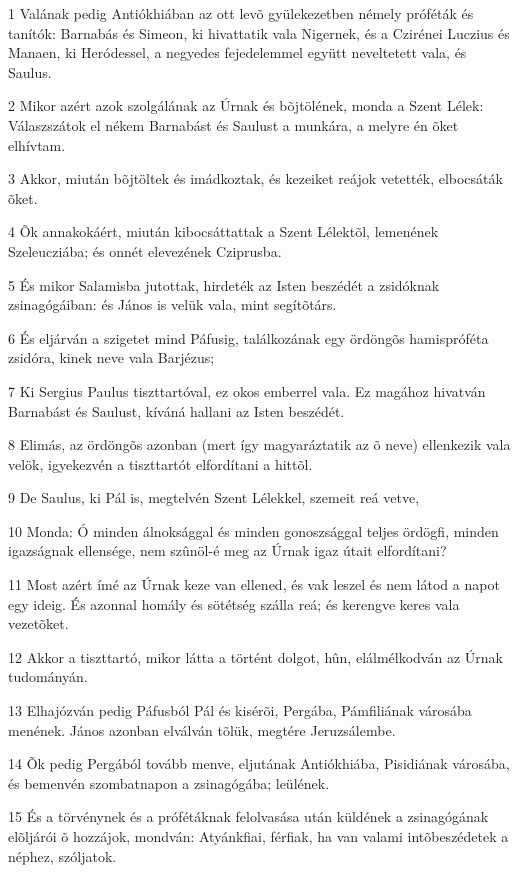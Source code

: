 \par 1 Valának pedig Antiókhiában az ott levõ gyülekezetben némely próféták és tanítók: Barnabás és Simeon, ki hivattatik vala Nigernek, és a Czirénei Luczius és Manaen, ki Heródessel, a negyedes fejedelemmel együtt neveltetett vala, és Saulus.
\par 2 Mikor azért azok szolgálának az Úrnak és bõjtölének, monda a Szent Lélek: Válaszszátok el nékem Barnabást és Saulust a munkára, a melyre én õket elhívtam.
\par 3 Akkor, miután bõjtöltek és imádkoztak, és kezeiket reájok vetették, elbocsáták õket.
\par 4 Õk annakokáért, miután kibocsáttattak a Szent Lélektõl, lemenének Szeleucziába; és onnét elevezének Cziprusba.
\par 5 És mikor Salamisba jutottak, hirdeték az Isten beszédét a zsidóknak zsinagógáiban: és János is velük vala, mint segítõtárs.
\par 6 És eljárván a szigetet mind Páfusig, találkozának egy ördöngõs hamispróféta zsidóra, kinek neve vala Barjézus;
\par 7 Ki Sergius Paulus tiszttartóval, ez okos emberrel vala. Ez magához hivatván Barnabást és Saulust, kíváná hallani az Isten beszédét.
\par 8 Elimás, az ördöngõs azonban (mert így magyaráztatik az õ neve) ellenkezik vala velök, igyekezvén a tiszttartót elfordítani a hittõl.
\par 9 De Saulus, ki Pál is, megtelvén Szent Lélekkel, szemeit reá vetve,
\par 10 Monda: Ó minden álnoksággal és minden gonoszsággal teljes ördögfi, minden igazságnak ellensége, nem szûnöl-é meg az Úrnak igaz útait elfordítani?
\par 11 Most azért ímé az Úrnak keze van ellened, és vak leszel és nem látod a napot egy ideig. És azonnal homály és sötétség szálla reá; és kerengve keres vala vezetõket.
\par 12 Akkor a tiszttartó, mikor látta a történt dolgot, hûn, elálmélkodván az Úrnak tudományán.
\par 13 Elhajózván pedig Páfusból Pál és kisérõi, Pergába, Pámfiliának városába menének. János azonban elválván tõlük, megtére Jeruzsálembe.
\par 14 Õk pedig Pergából tovább menve, eljutának Antiókhiába, Pisidiának városába, és bemenvén szombatnapon a zsinagógába; leülének.
\par 15 És a törvénynek és a prófétáknak felolvasása után küldének a zsinagógának elõljárói õ hozzájok, mondván: Atyánkfiai, férfiak, ha van valami intõbeszédetek a néphez, szóljatok.
